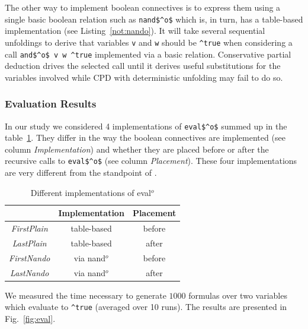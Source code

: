 The other way to implement boolean connectives is to express them using a single basic boolean relation such as \lstinline{nand$^o$} which is, in turn, has a table-based
implementation (see Listing~\ref{not:nando}). It will take several sequential unfoldings to derive that variables \lstinline{v} and \lstinline{w} should
be \lstinline{^true} when considering a call \lstinline{and$^o$ v w ^true} implemented via a basic relation.
Conservative partial deduction drives the selected call until it derives useful substitutions for the variables involved while CPD with deterministic unfolding may fail to do so.


\subsubsection{Evaluation Results}

In our study we considered 4 implementations of \lstinline{eval$^o$} summed up in the table~\ref{tbl:eval}. They differ in the way the boolean connectives are implemented (see column \emph{Implementation}) and whether they are placed before or after the recursive calls to \lstinline{eval$^o$} (see column \emph{Placement}).
These four implementations are very different from the  standpoint of \ecce.

\begin{table}[!h]
    \centering
    \begin{tabular}{c||c||c}
                      & Implementation & Placement \\ \hline\hline
    \emph{FirstPlain} & table-based    & before \\ \hline
    \emph{LastPlain}  & table-based    & after  \\ \hline
    \emph{FirstNando} & via nand$^o$   & before \\ \hline
    \emph{LastNando}  & via nand$^o$   & after  \\
    \end{tabular}

  \caption{Different implementations of eval$^o$}
  \label{tbl:eval}
\end{table}

We measured the time necessary to generate $1000$ formulas over two variables which evaluate to \lstinline{^true} (averaged over 10 runs).
The results are presented in Fig.~\ref{fig:eval}.

